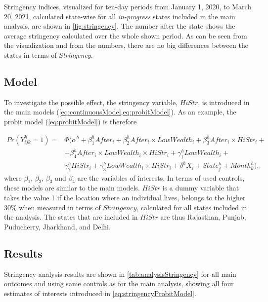 \documentclass[12pt,a4paper,notitlepage]{article}
\begin{document}
Stringency indices, visualized for ten-day periods from January 1, 2020, to March 20, 2021, calculated state-wise for all \textit{in-progress} states included in the main analysis, are shown in \cref{fig:stringency}. The number after the state shows the average stringency calculated over the whole shown period. As can be seen from the visualization and from the numbers, there are no big differences between the states in terms of \textit{Stringency}.

\subsection{Model} \label{subsec:stringencyModel}

To investigate the possible effect, the stringency variable, $HiStr$, is introduced in the main models (\cref{eq:continuousModel,eq:probitModel}). As an example, the probit model (\cref{eq:probitModel}) is therefore

\begin{equation} \label{eq:stringencyProbitModel}
\begin{split}
    Pr(Y_{ijk}^h = 1) = &\Phi(\alpha^h + \beta_{1}^h After_i + \beta_{2}^h After_i \times LowWealth_i + \beta_{3}^h After_i \times HiStr_i +\\
    & + \beta_{4}^h After_i \times LowWealth_i \times HiStr_i + \gamma_1^h LowWealth_i + \\
    & \gamma_2^h HiStr_i + \gamma_3^h LowWealth_i \times HiStr_i + \delta^h X_i + State_j^h + Month_k^h),
\end{split}
\end{equation}
%
where $\beta_1$, $\beta_2$, $\beta_3$ and $\beta_4$ are the variables of interests. In terms of used controls, these models are similar to the main models. $HiStr$ is a dummy variable that takes the value 1 if the location where an individual lives, belongs to the higher 30\% when measured in terms of $Stringency$, calculated for all states included in the analysis. The states that are included in $HiStr$ are thus Rajasthan, Punjab, Puducherry, Jharkhand, and Delhi.

\subsection{Results} \label{subsec:stringencyResults}

Stringency analysis results are shown in \cref{tab:analysisStringency} for all main outcomes and using same controls as for the main analysis, showing all four estimates of interests introduced in \cref{eq:stringencyProbitModel}.
\end{document}
